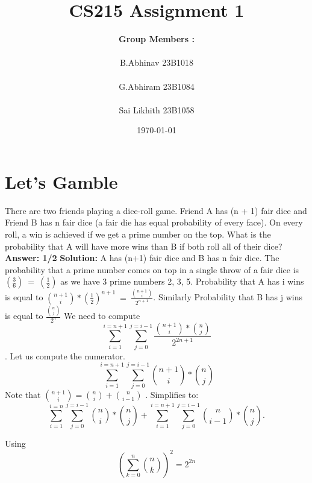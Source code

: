 \documentclass[12pt]{article}
\title{\Huge\textbf{CS215 Assignment 1}}
\author{\Large\textbf{ Group Members :} \\ \\ 
    \large B.Abhinav  23B1018 \\ \\ 
    \large G.Abhiram  23B1084 \\ \\
    \large Sai Likhith 23B1058 
}
\date{\today}
\begin{document}
\maketitle
\newpage

\tableofcontents
\newpage

\section{Let’s Gamble}

There are two friends playing a dice-roll game. Friend A has (n + 1) fair dice and Friend B has n
fair dice (a fair die has equal probability of every face). On every roll, a win is achieved if we get a
prime number on the top. What is the probability that A will have more wins than B if both roll
all of their dice?\\
\newline
\textbf{Answer: 1/2}
\newline \newline
\textbf{Solution: }
\newline
A has (n+1) fair dice and B has n fair dice. The probability that a prime number comes on top in a single throw of a fair dice is $\left(\frac{3}{6}\right)\ =\ \left(\frac{1}{2}\right)$
as we have 3 prime numbers 2, 3, 5.
\newline \newline
Probability that A has i wins is equal to $\binom{n+1}{i}*\left(\frac{1}{2}\right)^{n+1}\ =\ \frac{\binom{n+1}{i}}{2^{n+1}} $.
\newline
Similarly Probability that B has j wins is equal to $ \frac{\binom{n}{j}}{2^{n}} $
\newline
We need to compute \newline $$\sum_{i=1}^{i=n+1}\sum_{j=0}^{j=i-1}\frac{\binom{n+1}{i}*\binom{n}{j}}{2^{2n+1}} $$ .
\newline
Let us compute the numerator.
\begin{equation}
    \sum_{i=1}^{i=n+1}\sum_{j=0}^{j=i-1}\binom{n+1}{i}*\binom{n}{j}
\end{equation}
Note that $\binom{n+1}{i} = \binom{n}{i} + \binom{n}{i-1} $ . Simplifies to:
\begin{equation}
    \sum_{i=1}^{i=n}\sum_{j=0}^{j=i-1}\binom{n}{i}*\binom{n}{j} + \sum_{i=1}^{i=n+1}\sum_{j=0}^{j=i-1}\binom{n}{i-1}*\binom{n}{j} .
\end{equation}

Using 
\begin{equation*}
\left(\sum_{k=0}^n \binom{n}{k}\right)^2 = 2^{2n}
\end{equation*}
    
\end{document}
